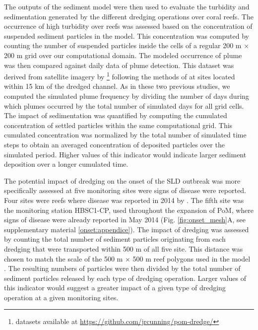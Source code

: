 The outputs of the sediment model were then used to evaluate the turbidity and sedimentation generated by the different dredging operations over coral reefs. The occurrence of high turbidity over reefs was assessed based on the concentration of suspended sediment particles in the model. This concentration was computed by counting the number of suspended particles inside the cells of a regular 200 m $\times$ 200 m grid over our computational domain. The modeled occurrence of plume was then compared against daily data of plume detection. This dataset was derived from satellite imagery by \cite{cunning2019extensive}\footnote{datasets available at \url{https://github.com/jrcunning/pom-dredge/}} following the methods of \cite{barnes2015sediment} at sites located within 15 km of the dredged channel. As in these two previous studies, we computed  the simulated plume frequency by dividing the number of days during which plumes occurred by the total number of simulated days for all grid cells. The impact of sedimentation was quantified by computing the cumulated concentration of settled particles within the same computational grid. This cumulated concentration was normalized by the total number of simulated time steps to obtain an averaged concentration of deposited particles over the simulated period. Higher values of this indicator would indicate larger sediment deposition over a longer cumulated time.

The potential impact of dredging on the onset of the SLD outbreak was more specifically assessed at five monitoring sites were signs of disease were reported. Four sites were reefs where disease was reported in 2014 by \cite{precht2016unprecedented}. The fifth site was the monitoring station HBSC1-CP, used throughout the expansion of PoM, where signs of disease were already reported in May 2014 (Fig. \ref{fig:onset_mesh}A, see supplementary material \ref{onset:appendice}). The impact of dredging was assessed by counting the total number of sediment particles originating from each dredging that were transported within 500 m of all five site. This distance was chosen to match the scale of the 500 m $\times$ 500 m reef polygons used in the model \citep{dobbelaere2020coupled}. The resulting numbers of particles were then divided by the total number of sediment particles released by each type of dredging operation. Larger values of this indicator would suggest a greater impact of a given type of dredging operation at a given monitoring sites.  

